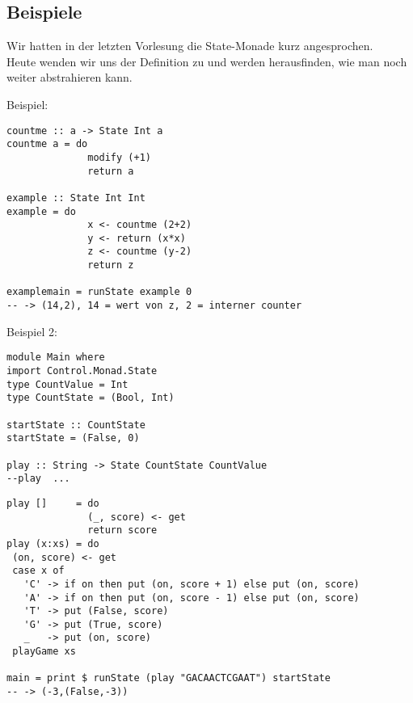 \documentclass{beamer}
\begin{document}
\subsection{Beispiele}
\begin{frame}[fragile]
Wir hatten in der letzten Vorlesung die State-Monade kurz angesprochen.\\
Heute wenden wir uns der Definition zu und werden herausfinden, wie man noch weiter abstrahieren kann.\\
\end{frame}

\begin{frame}[fragile]
Beispiel:
\begin{verbatim}
countme :: a -> State Int a
countme a = do
              modify (+1)
              return a

example :: State Int Int
example = do
              x <- countme (2+2)
              y <- return (x*x)
              z <- countme (y-2)
              return z

examplemain = runState example 0
-- -> (14,2), 14 = wert von z, 2 = interner counter
\end{verbatim}
\end{frame}

\begin{frame}[fragile]
Beispiel 2:
\begin{verbatim}
module Main where
import Control.Monad.State
type CountValue = Int
type CountState = (Bool, Int)
 
startState :: CountState
startState = (False, 0)

play :: String -> State CountState CountValue
--play  ...

\end{verbatim}
\end{frame}

\begin{frame}[fragile]
\begin{verbatim}
play []     = do
              (_, score) <- get
              return score
play (x:xs) = do
 (on, score) <- get
 case x of
   'C' -> if on then put (on, score + 1) else put (on, score)
   'A' -> if on then put (on, score - 1) else put (on, score)
   'T' -> put (False, score)
   'G' -> put (True, score)
   _   -> put (on, score)
 playGame xs

main = print $ runState (play "GACAACTCGAAT") startState
-- -> (-3,(False,-3))
\end{verbatim}
\end{frame}
\end{document}
